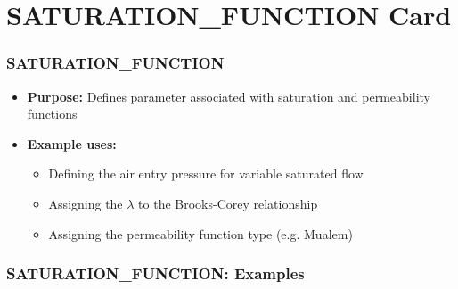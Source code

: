 \section{SATURATION\_FUNCTION Card}

\begin{frame}\frametitle{SATURATION\_FUNCTION}

\begin{itemize}
\item[] \textbf{Purpose:} Defines parameter associated with saturation and permeability functions
\item[] \textbf{Example uses:}
\begin{itemize}
  \item Defining the air entry pressure for variable saturated flow
  \item Assigning the $\lambda$ to the Brooks-Corey relationship
  \item Assigning the permeability function type (e.g. Mualem)
\end{itemize}
\end{itemize}

\end{frame}

\begin{frame}[fragile]\frametitle{SATURATION\_FUNCTION: Examples}

\end{frame}
